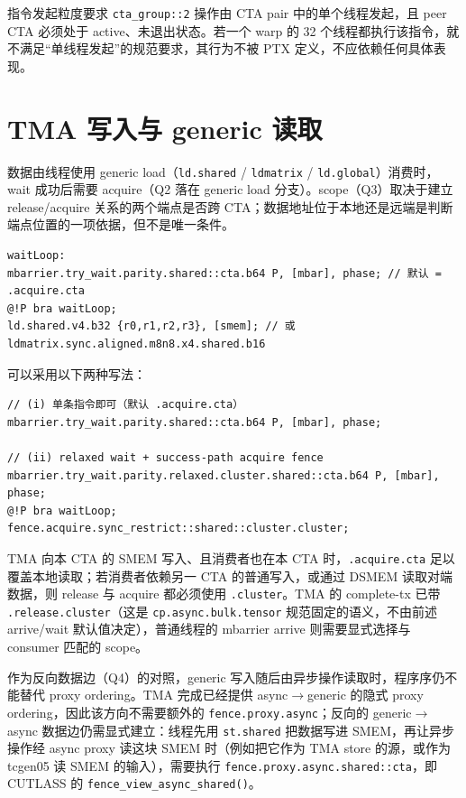 指令发起粒度要求 \lstinline|cta_group::2| 操作由 CTA pair 中的单个线程发起，且 peer CTA 必须处于 active、未退出状态。若一个 warp 的 32 个线程都执行该指令，就不满足“单线程发起”的规范要求，其行为不被 PTX 定义，不应依赖任何具体表现。

\section{TMA 写入与 generic 读取}

数据由线程使用 generic load（\lstinline|ld.shared| / \lstinline|ldmatrix| / \lstinline|ld.global|）消费时，wait 成功后需要 acquire（Q2 落在 generic load 分支）。scope（Q3）取决于建立 release/acquire 关系的两个端点是否跨 CTA；数据地址位于本地还是远端是判断端点位置的一项依据，但不是唯一条件。

\begin{lstlisting}
waitLoop:
mbarrier.try_wait.parity.shared::cta.b64 P, [mbar], phase; // 默认 = .acquire.cta
@!P bra waitLoop;
ld.shared.v4.b32 {r0,r1,r2,r3}, [smem]; // 或 ldmatrix.sync.aligned.m8n8.x4.shared.b16
\end{lstlisting}

可以采用以下两种写法：

\begin{lstlisting}
// (i) 单条指令即可（默认 .acquire.cta）
mbarrier.try_wait.parity.shared::cta.b64 P, [mbar], phase;

// (ii) relaxed wait + success-path acquire fence
mbarrier.try_wait.parity.relaxed.cluster.shared::cta.b64 P, [mbar], phase;
@!P bra waitLoop;
fence.acquire.sync_restrict::shared::cluster.cluster;
\end{lstlisting}

TMA 向本 CTA 的 SMEM 写入、且消费者也在本 CTA 时，\lstinline|.acquire.cta| 足以覆盖本地读取；若消费者依赖另一 CTA 的普通写入，或通过 DSMEM 读取对端数据，则 release 与 acquire 都必须使用 \lstinline|.cluster|。TMA 的 complete-tx 已带 \lstinline|.release.cluster|（这是 \lstinline|cp.async.bulk.tensor| 规范固定的语义，不由前述 arrive/wait 默认值决定），普通线程的 mbarrier arrive 则需要显式选择与 consumer 匹配的 scope。

作为反向数据边（Q4）的对照，generic 写入随后由异步操作读取时，程序序仍不能替代 proxy ordering。TMA 完成已经提供 async$\rightarrow$generic 的隐式 proxy ordering，因此该方向不需要额外的 \lstinline|fence.proxy.async|；反向的 generic$\rightarrow$async 数据边仍需显式建立：线程先用 \lstinline|st.shared| 把数据写进 SMEM，再让异步操作经 async proxy 读这块 SMEM 时（例如把它作为 TMA store 的源，或作为 tcgen05 读 SMEM 的输入），需要执行 \lstinline|fence.proxy.async.shared::cta|，即 CUTLASS 的 \lstinline|fence_view_async_shared()|。

